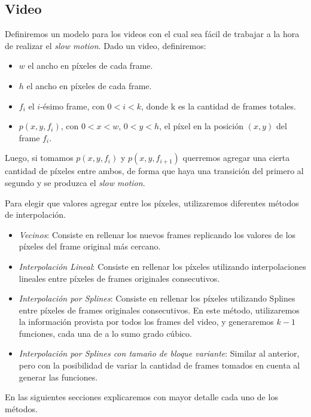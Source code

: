 \subsection{Video}

Definiremos un modelo para los videos con el cual sea fácil de trabajar a la hora de realizar
el \textit{slow motion}.
Dado un video, definiremos:
\begin{itemize}
    \item $w$ el ancho en píxeles de cada frame.
    \item $h$ el ancho en píxeles de cada frame.
    \item $f_i$ el $i$-ésimo frame, con $0< i < k$, donde k es la cantidad de frames totales.
    \item $p(x,y,f_i)$, con $0 < x < w$, $0< y < h$, el píxel en la posición $(x,y)$ del frame $f_i$.
\end{itemize}

Luego, si tomamos $p(x,y,f_i)$ y $p(x,y,f_{i+1})$ querremos agregar una cierta cantidad
de píxeles entre ambos, de forma que haya una transición del primero al segundo y
se produzca el \textit{slow motion}.

Para elegir que valores agregar entre los píxeles, utilizaremos diferentes métodos
de interpolación.
\begin{itemize}
    \item \textit{Vecinos}: Consiste en rellenar los nuevos frames replicando los
        valores de los píxeles del frame original más cercano.
    \item \textit{Interpolación Lineal}: Consiste en rellenar los píxeles utilizando
        interpolaciones lineales entre píxeles de frames originales consecutivos.
    \item \textit{Interpolación por Splines}: Consiste en rellenar los píxeles utilizando
        Splines entre píxeles de frames originales consecutivos. En este método,
        utilizaremos la información provista por todos los frames del video,
        y generaremos $k-1$ funciones, cada una de a lo sumo grado cúbico.
    \item \textit{Interpolación por Splines con tamaño de bloque variante}:
        Similar al anterior, pero con la posibilidad de variar la cantidad de frames
        tomados en cuenta al generar las funciones.
\end{itemize}

En las siguientes secciones explicaremos con mayor detalle cada uno de los métodos.

